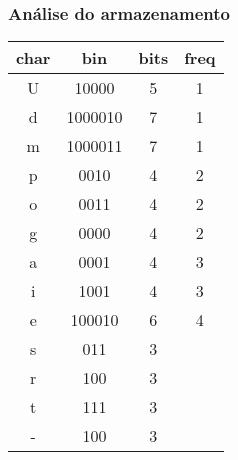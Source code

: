 \documentclass[10pt, handout]{beamer}
\begin{document}
\begin{frame}[t]
    \frametitle{Análise do armazenamento}
    \begin{center}
        \begin{tabular}{c|c|c|c}
            char & bin     & bits & freq \\
            \hline
            U    & 10000   & 5    &     1\\
            d    & 1000010 & 7    &1     \\
            m    & 1000011 & 7    &  1   \\
            p    & 0010    & 4    &   2  \\
            o    & 0011    & 4    &   2  \\
            g    & 0000    & 4    &   2  \\
            a    & 0001    & 4    &   3  \\
            i    & 1001    & 4    &   3  \\
            e    & 100010  & 6    &   4  \\
            s    & 011     & 3    &     \\
            r    & 100     & 3    &     \\
            t    & 111     & 3    &     \\
            -    & 100     & 3    &     \\
        \end{tabular}
    \end{center}

\end{frame}
\end{document}
